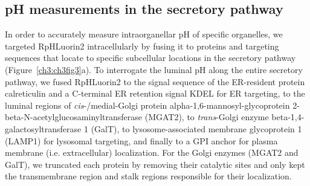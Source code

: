 \begin{figure}[t]
\end{figure}

\subsection{pH measurements in the secretory pathway}

In order to accurately measure intraorganellar pH of specific organelles, we targeted RpHLuorin2 intracellularly by fusing it to proteins and targeting sequences that locate to specific subcellular locations in the secretory pathway (Figure~\ref{ch3:ch3fig3}a). To interrogate the luminal pH along the entire secretory pathway, we fused RpHLuorin2 to the signal sequence of the ER-resident protein calreticulin and a C-terminal ER retention signal KDEL for ER targeting, to the luminal regions of \emph{cis}-/medial-Golgi protein alpha-1,6-mannosyl-glycoprotein 2-beta-N-acetylglucosaminyltransferase (MGAT2), to \emph{trans}-Golgi enzyme beta-1,4-galactosyltransferase 1 (GalT), to lysosome-associated membrane glycoprotein 1 (LAMP1) for lysosomal targeting, and finally to a GPI anchor for plasma membrane (i.e. extracellular) localization. For the Golgi enzymes (MGAT2 and GalT), we truncated each protein by removing their catalytic sites and only kept the transmembrane region and stalk regions responsible for their localization\cite{welch_tale_2019,tie_novel_2016,boncompain_synchronization_2012}.

